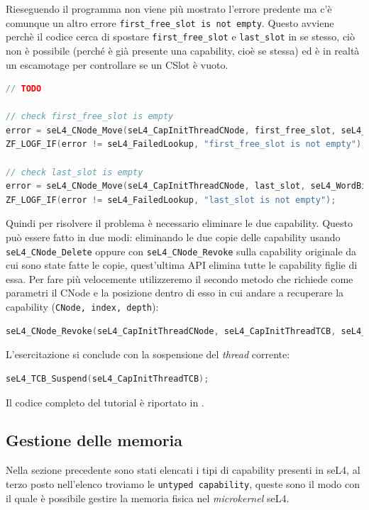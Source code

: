Rieseguendo il programma non viene più mostrato l'errore predente ma c'è comunque un altro errore \texttt{first\_free\_slot is not empty}. Questo avviene perchè il codice cerca di spostare \texttt{first\_free\_slot} e \texttt{last\_slot} in se stesso, ciò non è possibile (perché è già presente una capability, cioè se stessa) ed è in realtà un escamotage per controllare se un CSlot è vuoto.
\begin{lstlisting}[language=C++]
// TODO 
         
// check first_free_slot is empty
error = seL4_CNode_Move(seL4_CapInitThreadCNode, first_free_slot, seL4_WordBits, seL4_CapInitThreadCNode, first_free_slot, seL4_WordBits);
ZF_LOGF_IF(error != seL4_FailedLookup, "first_free_slot is not empty");

// check last_slot is empty
error = seL4_CNode_Move(seL4_CapInitThreadCNode, last_slot, seL4_WordBits, seL4_CapInitThreadCNode, last_slot, seL4_WordBits);
ZF_LOGF_IF(error != seL4_FailedLookup, "last_slot is not empty");
\end{lstlisting}

Quindi per risolvere il problema è necessario eliminare le due capability. Questo può essere fatto in due modi: eliminando le due copie delle capability usando \texttt{seL4\_CNode\_Delete} oppure con \texttt{seL4\_CNode\_Revoke} sulla capability originale da cui sono state fatte le copie, quest'ultima API elimina tutte le capability figlie di essa. Per fare più velocemente utilizzeremo il secondo metodo che richiede come parametri il CNode e la posizione dentro di esso in cui andare a recuperare la capability (\texttt{CNode, index, depth}):
\begin{lstlisting}[language=C++]
seL4_CNode_Revoke(seL4_CapInitThreadCNode, seL4_CapInitThreadTCB, seL4_WordBits);
\end{lstlisting}

L'esercitazione si conclude con la sospensione del \textit{thread} corrente:
\begin{lstlisting}[language=C++]
seL4_TCB_Suspend(seL4_CapInitThreadTCB);
\end{lstlisting}
Il codice completo del tutorial è riportato in \cite{capability}.

\subsection{Gestione delle memoria}
Nella sezione precedente sono stati elencati i tipi di capability presenti in seL4, al terzo posto nell'elenco troviamo le \texttt{untyped capability}, queste sono il modo con il quale è possibile gestire la memoria fisica nel \textit{microkernel} seL4.

